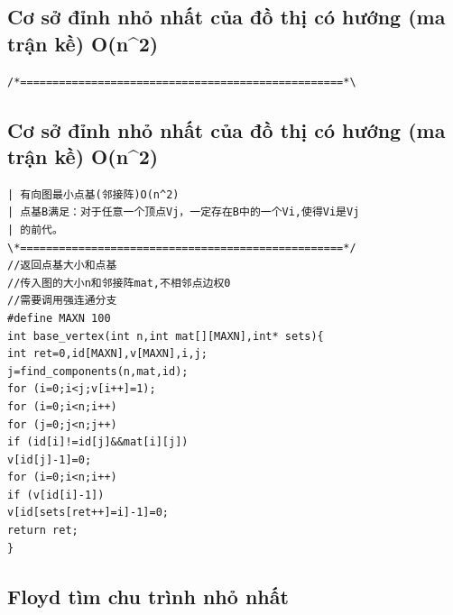 \documentclass[11pt]{article}
\begin{document}
\subsection{Cơ sở đỉnh nhỏ nhất của đồ thị có hướng (ma trận kề) O(n\textasciicircum{}2)}

\begingroup
\scriptsize
\begin{verbatim}
/*==================================================*\
\end{verbatim}
\endgroup

\subsection{Cơ sở đỉnh nhỏ nhất của đồ thị có hướng (ma trận kề) O(n\textasciicircum{}2)}

\begingroup
\scriptsize
\begin{verbatim}
| 有向图最小点基(邻接阵)O(n^2)
| 点基B满足：对于任意一个顶点Vj，一定存在B中的一个Vi,使得Vi是Vj
| 的前代。
\*==================================================*/
//返回点基大小和点基
//传入图的大小n和邻接阵mat,不相邻点边权0
//需要调用强连通分支
#define MAXN 100
int base_vertex(int n,int mat[][MAXN],int* sets){
int ret=0,id[MAXN],v[MAXN],i,j;
j=find_components(n,mat,id);
for (i=0;i<j;v[i++]=1);
for (i=0;i<n;i++)
for (j=0;j<n;j++)
if (id[i]!=id[j]&&mat[i][j])
v[id[j]-1]=0;
for (i=0;i<n;i++)
if (v[id[i]-1])
v[id[sets[ret++]=i]-1]=0;
return ret;
}
\end{verbatim}
\endgroup

\subsection{Floyd tìm chu trình nhỏ nhất}
\end{document}
